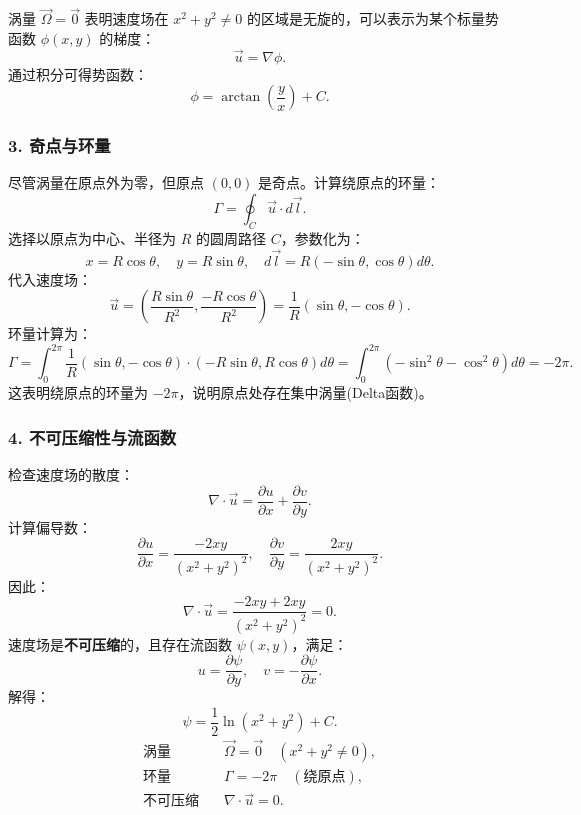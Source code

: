\begin{example}
\begin{solution}
涡量 \(\vec{\Omega} = \vec{0}\) 表明速度场在 \(x^2 + y^2 \neq 0\) 的区域是无旋的，可以表示为某个标量势函数 \(\phi(x, y)\) 的梯度：
\[
\vec{u} = \nabla \phi.
\]
通过积分可得势函数：
\[
\phi = \arctan\left(\frac{y}{x}\right) + C.
\]

\subsubsection*{3. 奇点与环量}

尽管涡量在原点外为零，但原点 \((0, 0)\) 是奇点。计算绕原点的环量：
\[
\Gamma = \oint_C \vec{u} \cdot d\vec{l}.
\]
选择以原点为中心、半径为 \(R\) 的圆周路径 \(C\)，参数化为：
\[
x = R\cos\theta, \quad y = R\sin\theta, \quad d\vec{l} = R(-\sin\theta, \cos\theta) d\theta.
\]
代入速度场：
\[
\vec{u} = \left( \frac{R\sin\theta}{R^2}, \frac{-R\cos\theta}{R^2} \right) = \frac{1}{R}(\sin\theta, -\cos\theta).
\]
环量计算为：
\[
\Gamma = \int_0^{2\pi} \frac{1}{R}(\sin\theta, -\cos\theta) \cdot \left(-R\sin\theta, R\cos\theta\right) d\theta = \int_0^{2\pi} (-\sin^2\theta - \cos^2\theta) d\theta = -2\pi.
\]
这表明绕原点的环量为 \(-2\pi\)，说明原点处存在集中涡量(Delta函数)。

\subsubsection*{4. 不可压缩性与流函数}

检查速度场的散度：
\[
\nabla \cdot \vec{u} = \frac{\partial u}{\partial x} + \frac{\partial v}{\partial y}.
\]
计算偏导数：
\[
\frac{\partial u}{\partial x} = \frac{-2xy}{(x^2 + y^2)^2}, \quad \frac{\partial v}{\partial y} = \frac{2xy}{(x^2 + y^2)^2}.
\]
因此：
\[
\nabla \cdot \vec{u} = \frac{-2xy + 2xy}{(x^2 + y^2)^2} = 0.
\]
速度场是\textbf{不可压缩}的，且存在流函数 \(\psi(x, y)\)，满足：
\[
u = \frac{\partial \psi}{\partial y}, \quad v = -\frac{\partial \psi}{\partial x}.
\]
解得：
\[
\psi = \frac{1}{2} \ln(x^2 + y^2) + C.
\]
\[
\boxed{
\begin{aligned}
\text{涡量} &\quad \vec{\Omega} = \vec{0} \quad (x^2 + y^2 \neq 0), \\
\text{环量} &\quad \Gamma = -2\pi \quad (\text{绕原点}), \\
\text{不可压缩} &\quad \nabla \cdot \vec{u} = 0.
\end{aligned}
}
\]
\end{solution}
\end{example}
